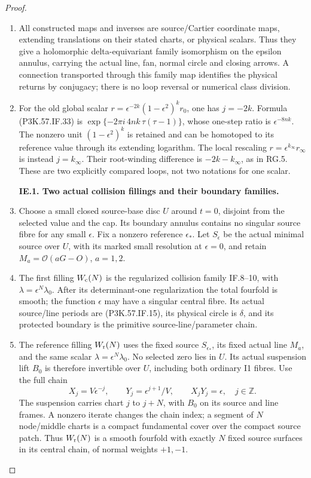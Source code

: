 \begin{proof}
\begin{enumerate}[label=\arabic*.]
\item All constructed maps and inverses are
source/Cartier coordinate maps,
extending translations on their stated
charts, or physical scalars. Thus they
give a holomorphic delta-equivariant
family isomorphism on the epsilon
annulus, carrying the actual line,
fan, normal circle and closing arrows.
A connection transported through
this family map identifies the physical
returns by conjugacy; there is no
loop reversal or numerical class division.

\item For the old global scalar
\(r=\epsilon^{-2k}(1-\epsilon^2)^kr_0\),
one has \(j=-2k\). Formula (P3K.57.IF.33) is
\(\exp\{-2\pi i\,4nk\,\tau(\tau-1)\}\),
whose one-step ratio is
\(\epsilon^{-8nk}\). The nonzero unit
\((1-\epsilon^2)^k\) is retained and
can be homotoped to its reference value
through its extending logarithm.
The local rescaling
\(r=\epsilon^{k_\infty}r_\infty\)
is instead \(j=k_\infty\). Their
root-winding difference is
\(-2k-k_\infty\), as in RG.5.
These are two explicitly compared
loops, not two notations for one scalar.

\par\medskip\noindent\textbf{IE.1. Two actual collision fillings and their boundary families.}\par\nopagebreak[4]

\item Choose a small closed source-base disc \(U\) around \(t=0\), disjoint
from the selected value and the cap. Its boundary annulus contains no
singular source fibre for any small \(\epsilon\). Fix a nonzero
reference \(\epsilon_*\). Let \(S_\epsilon\) be the actual minimal
source over \(U\), with its marked small resolution at \(\epsilon=0\),
and retain \(M_a=\mathcal O(aG-O)\), \(a=1,2\).

\item The first filling \(W_{\rm c}(N)\) is the regularized collision family
IF.8--10, with \(\lambda=\epsilon^N\lambda_0\). After its
determinant-one regularization the total fourfold is smooth; the
function \(\epsilon\) may have a singular central fibre. Its actual
source/line periods are (P3K.57.IF.15), its physical circle is \(\delta\),
and its protected boundary is the primitive source-line/parameter
chain.

\item The reference filling \(W_{\rm r}(N)\) uses the fixed source
\(S_{\epsilon_*}\), its fixed actual line \(M_a\), and the same scalar
\(\lambda=\epsilon^N\lambda_0\). No selected zero lies in \(U\).
Its actual suspension lift \(B_0\) is therefore invertible over
\(U\), including both ordinary I1 fibres. Use the full chain
\[
 X_j=V\epsilon^{-j},\qquad
 Y_j=\epsilon^{j+1}/V,\qquad X_jY_j=\epsilon ,
 \quad j\in\mathbb Z.                                  \tag{P3K.57.IE.1}
\]
The suspension carries chart \(j\) to \(j+N\), with \(B_0\) on
its source and line frames. A nonzero iterate changes the chain
index; a segment of \(N\) node/middle charts is a compact
fundamental cover over the compact source patch. Thus
\(W_{\rm r}(N)\) is a smooth fourfold with exactly \(N\) fixed
source surfaces in its central chain, of normal weights \(+1,-1\).


\end{enumerate}
\end{proof}
